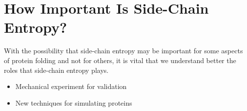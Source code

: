 \section*{How Important Is Side-Chain Entropy?}
\label{sec:how_important_is_side_chain_entropy_}
With the possibility that side-chain entropy may be important for some aspects of protein folding and not for others, it is vital that we understand better the roles that side-chain entropy plays.
\begin{itemize}
	\item Mechanical experiment for validation
	\item New techniques for simulating proteins
\end{itemize}